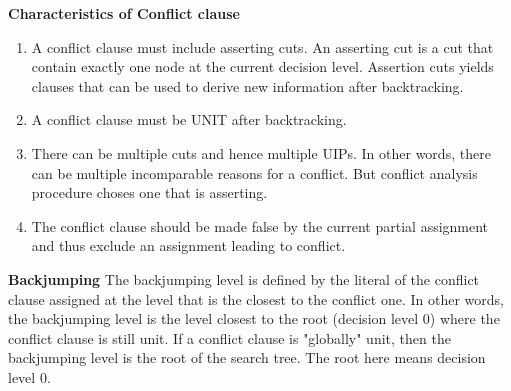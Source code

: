\documentclass{article}
\begin{document}
\textbf{Characteristics of Conflict clause}
\begin{enumerate}
\item A conflict clause must include asserting cuts. An asserting cut is a cut
that contain exactly one node at the current decision level. Assertion cuts yields 
clauses that can be used to derive new information after backtracking.

\item A conflict clause must be UNIT after backtracking. 

\item There can be multiple cuts and hence multiple UIPs. In other words, there
can be multiple incomparable reasons for a conflict. But conflict analysis
procedure choses one that is asserting. 

\item The conflict clause should be made false by the current partial assignment
and thus exclude an assignment leading to conflict. 
\end{enumerate}

\textbf{Backjumping}
The backjumping level is defined by the literal of the conflict clause assigned
at the level that is the closest to the conflict one. In other words, the
backjumping level is the level closest to the root (decision level 0)  where the
conflict clause is still unit. If a conflict clause is "globally"  unit, then
the backjumping level is the root of the search tree. The root here means
decision level 0. 
\end{document}
